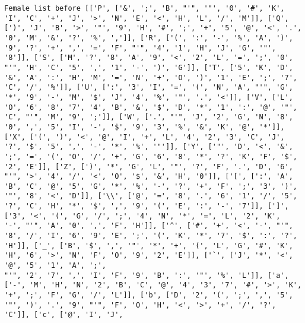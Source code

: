 \documentclass{article}
\begin{document}
\begin{verbatim}
Female list before [['P', ['&', ';', 'B', "'", '"', '0', '#', 'K', 'I', 'C', '+', 'J', '>', 'N', 'E', '<', 'H', 'L', '/', 'M']], ['Q', [')', 'J', 'B', '>', '"', '9', 'H', '#', ';', '+', '5', '@', '<', '.', '0', 'M', '&', '?', '%', ',']], ['R', ['(', ':', '-', '%', 'A', ')', '9', '?', '+', ',', '=', 'F', "'", '4', '1', 'H', 'J', 'G', '"', '8']], ['S', ['M', '?', '8', 'A', '9', '<', '2', 'L', '=', ';', '0', "'", 'H', 'C', '5', ',', '1', '-', ')', 'G']], ['T', ['5', 'K', 'D', '&', 'A', ':', 'H', 'M', '=', 'N', '+', 'O', ')', '1', 'E', ';', '7', 'C', '/', '%']], ['U', [':', '3', 'I', '=', '(', 'N', 'A', "'", 'G', '*', '9', '-', 'M', '$', 'J', '4', '%', '"', '.', '<']], ['V', ['L', 'O', '6', '8', '7', '4', 'B', '&', '$', 'D', '*', '1', ':', '@', '"', 'C', "'", 'M', '9', ';']], ['W', ['.', "'", 'J', '2', 'G', 'N', '8', '0', ',', '5', 'I', '-', '$', '9', '3', '%', '&', 'K', '@', '*']], ['X', ['(', ')', '<', '@', 'I', '+', 'L', '4', '2', '3', 'C', 'J', '?', '$', '5', ',', '-', '*', '%', '"']], ['Y', ['"', 'D', '<', '&', ';', '=', '(', 'O', '/', '+', 'G', '6', '8', '*', '?', 'K', 'F', '$', '2', 'E']], ['Z', [')', '*', 'G', 'L', '"', '?', 'F', '.', 'D', '6', "'", '>', '4', '/', '<', 'O', '$', '&', 'H', '0']], ['[', [':', 'A', 'B', 'C', '@', '5', 'G', '*', '%', '-', '?', '+', 'F', ';', '3', ')', '"', '8', '<', 'D']], ['\\', ['@', '=', '8', '.', '6', '1', '/', '5', '?', 'C', 'H', '*', '$', ',', '9', '(', 'E', ':', '-', '7']], [']', ['3', '<', '(', 'G', '/', ';', '4', 'N', '*', '=', 'L', '2', 'K', 
'-', "'", 'A', '0', ',', 'F', 'H']], ['^', ['#', '+', '<', '-', "'", '8', '/', 'I', '6', '9', 'E', ';', '(', 'K', '*', '7', '$', ':', '?', 'H']], ['_', ['B', '$', ',', '"', '*', '+', '(', 'L', 'G', '#', 'K', 'H', '6', '>', 'N', 'F', 'O', '9', '2', 'E']], ['`', ['J', '*', '<', '@', '5', '1', 'A', ';', 
"'", '2', '7', ',', 'I', 'F', '9', 'B', ':', '"', '%', 'L']], ['a', ['-', 'M', 'H', 'N', '2', 'B', 'C', '@', '4', '3', '7', '#', '>', 'K', '+', ';', 'F', 'G', '/', 'L']], ['b', ['D', '2', '(', ';', ',', '5', '"', ')', '.', '9', "'", 'F', 'O', 'H', '<', '>', '+', '/', '?', 'C']], ['c', ['@', 'I', 'J', 

\end{verbatim}
\end{document}
